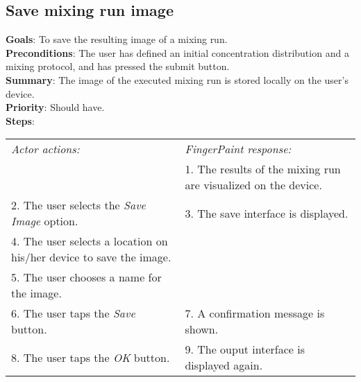 \begin{appendices}
\section{Save mixing run image}
  \textbf{Goals}: To save the resulting image of a mixing run.\\
  \textbf{Preconditions}: The user has defined an initial concentration distribution and a mixing protocol, and has pressed the submit button.\\
  \textbf{Summary}: The image of the executed mixing run is stored locally on the user's device.\\
  \textbf{Priority}: Should have.\\
  \textbf{Steps}: \\
  \begin{tabular}{ p{} p{} }
  	\emph{Actor actions:} & \emph{FingerPaint response:} \\
	   & 1. The results of the mixing run are visualized on the device. \\
	 2. The user selects the \emph{Save Image} option. & 3. The save interface is displayed.\\
	 4. The user selects a location on his/her device to save the image. & \\
	 5. The user chooses a name for the image. & \\
	 6. The user taps the \emph{Save} button. & 7. A confirmation message is shown. \\
	 8. The user taps the \emph{OK} button. & 9. The ouput interface is displayed again. \\
  \end{tabular}


\end{appendices}
